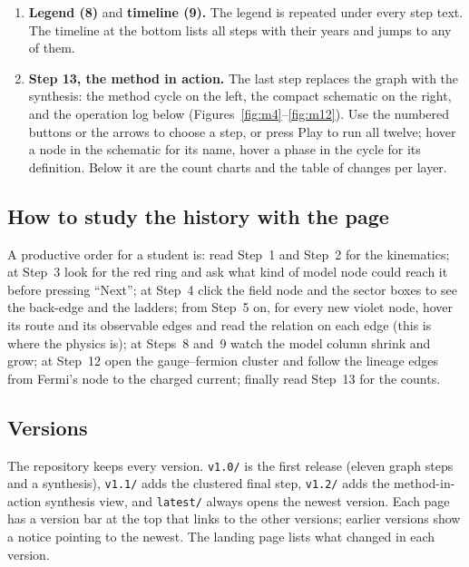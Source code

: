 \begin{enumerate}
\item \textbf{Legend (8)} and \textbf{timeline (9).} The legend is repeated under every step text. The timeline at the bottom lists all steps with their years and jumps to any of them.
\item \textbf{Step 13, the method in action.} The last step replaces the graph with the synthesis: the method cycle on the left, the compact schematic on the right, and the operation log below (Figures~\ref{fig:m4}--\ref{fig:m12}). Use the numbered buttons or the arrows to choose a step, or press Play to run all twelve; hover a node in the schematic for its name, hover a phase in the cycle for its definition. Below it are the count charts and the table of changes per layer.
\end{enumerate}

\subsection{How to study the history with the page}
A productive order for a student is: read Step~1 and Step~2 for the kinematics; at Step~3 look for the red ring and ask what kind of model node could reach it before pressing ``Next''; at Step~4 click the field node and the sector boxes to see the back-edge and the ladders; from Step~5 on, for every new violet node, hover its route and its observable edges and read the relation on each edge (this is where the physics is); at Steps~8 and~9 watch the model column shrink and grow; at Step~12 open the gauge--fermion cluster and follow the lineage edges from Fermi's node to the charged current; finally read Step~13 for the counts.

\subsection{Versions}
The repository keeps every version. \texttt{v1.0/} is the first release (eleven graph steps and a synthesis), \texttt{v1.1/} adds the clustered final step, \texttt{v1.2/} adds the method-in-action synthesis view, and \texttt{latest/} always opens the newest version. Each page has a version bar at the top that links to the other versions; earlier versions show a notice pointing to the newest. The landing page lists what changed in each version.

